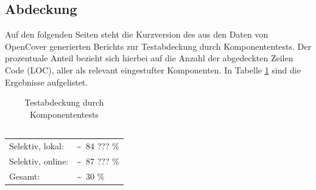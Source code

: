 %






\subsection{Abdeckung}
\label{Abschnitt:Tests:Statistik:Abdeckung}

\newcommand\VSLocalCoverage{\textasciitilde~84 ??? \%}

\newcommand\OnlineLocalCoverage{\textasciitilde~87 ??? \%}

\newcommand\VSGlobalCoverage{\textasciitilde~30 \%}

Auf den folgenden Seiten steht die Kurzversion des aus den Daten von OpenCover generierten Berichts zur Testabdeckung durch Komponententests.
Der prozentuale Anteil bezieht sich hierbei auf die Anzahl der abgedeckten Zeilen Code (LOC), aller als relevant eingestufter Komponenten. In Tabelle \ref{Abschnitt:Tests:Statistik:Abdeckung:Tabelle} sind die Ergebnisse aufgelistet.

\begin{longtable}{p{0.5\hsize}p{0.5\hsize}}

	\caption{Testabdeckung durch Komponententests\\~\\}
	\label{Abschnitt:Tests:Statistik:Abdeckung:Tabelle}
	\\

	  Selektiv, lokal:
	& \VSLocalCoverage \\
	
	  Selektiv, online:
	& \OnlineLocalCoverage \\
	
	  Gesamt:
	& \VSGlobalCoverage \\

\end{longtable}

~\\

